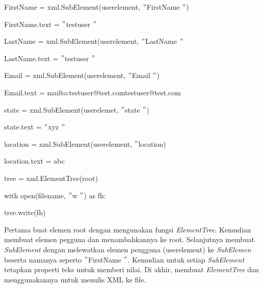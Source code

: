\vspace{10pt}
\noindent 
{\fontsize{10pt}{10pt}\selectfont FirstName = xml.SubElement(userelement,  $ " $FirstName $ " $)} \par
\noindent 
{\fontsize{10pt}{10pt}\selectfont FirstName.text =  $ " $testuser $ " $} \par
\vspace{10pt}
\noindent 
{\fontsize{10pt}{10pt}\selectfont LastName = xml.SubElement(userelement,  $ " $LastName $ " $} \par
\noindent 
{\fontsize{10pt}{10pt}\selectfont LastName.text =  $ " $testuser $ " $} \par
\vspace{10pt}
\noindent 
{\fontsize{10pt}{10pt}\selectfont Email = xml.SubElement(userelement,  $ " $Email $ " $)} \par
\noindent 
{\fontsize{10pt}{10pt}\selectfont Email.text = {mailto:testuser@test.com}{testuser@test.com}
} \par
\vspace{10pt}
\noindent 
{\fontsize{10pt}{10pt}\selectfont state = xml.SubElement(userelemet,  $ " $state $ " $)} \par
\noindent 
{\fontsize{10pt}{10pt}\selectfont state.text =  $ " $xyz $ " $} \par
\vspace{10pt}
\noindent 
{\fontsize{10pt}{10pt}\selectfont location = xml.SubElement(userelement,  $ " $location)} \par
\noindent 
{\fontsize{10pt}{10pt}\selectfont location.text = abc} \par
\vspace{10pt}
\noindent 
{\fontsize{10pt}{10pt}\selectfont tree = xml.ElementTree(root)} \par
\noindent 
{\fontsize{10pt}{10pt}\selectfont with open(filename,  $ " $w $ " $) as fh:} \par
\noindent 
{\fontsize{10pt}{10pt}\selectfont tree.write(fh)} \par
\vspace{10pt}
\noindent 
 \hspace*{0.5in} Pertama buat elemen root dengan mengunakan fungsi \textit{ElementTree}. Kemudian membuat elemen pegguna dan menambahkannya ke root. Selanjutnya membuat \textit{SubElement }dengan melewatkan elemen pengguna (userelement) ke \textit{SubElemen} beserta namanya seperto  $ " $FirstName $ " $. Kemudian untuk setiap \textit{SubElement} tetapkan properti teks untuk memberi nilai. Di akhir, membuat \textit{ElementTree} dan menggunakannya untuk menulis XML ke file. \par
